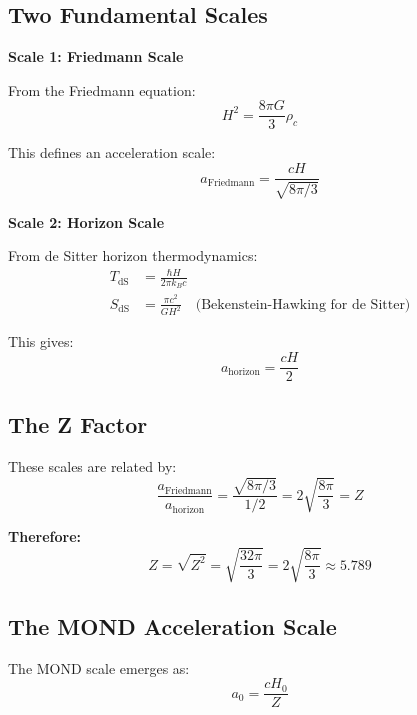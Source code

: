 \documentclass[12pt,a4paper]{article}
\begin{document}
\subsection{Two Fundamental Scales}

\textbf{Scale 1: Friedmann Scale}

From the Friedmann equation:
\begin{equation}
H^2 = \frac{8\pi G}{3} \rho_c
\end{equation}

This defines an acceleration scale:
\begin{equation}
a_{\text{Friedmann}} = \frac{cH}{\sqrt{8\pi/3}}
\end{equation}

\textbf{Scale 2: Horizon Scale}

From de Sitter horizon thermodynamics:
\begin{align}
T_{\text{dS}} &= \frac{\hbar H}{2\pi k_B c} \\
S_{\text{dS}} &= \frac{\pi c^2}{G H^2} \quad \text{(Bekenstein-Hawking for de Sitter)}
\end{align}

This gives:
\begin{equation}
a_{\text{horizon}} = \frac{cH}{2}
\end{equation}

\subsection{The Z Factor}

These scales are related by:
\begin{equation}
\frac{a_{\text{Friedmann}}}{a_{\text{horizon}}} = \frac{\sqrt{8\pi/3}}{1/2} = 2\sqrt{\frac{8\pi}{3}} = Z
\end{equation}

\textbf{Therefore:}
\begin{equation}
Z = \sqrt{Z^2} = \sqrt{\frac{32\pi}{3}} = 2\sqrt{\frac{8\pi}{3}} \approx 5.789
\end{equation}

\subsection{The MOND Acceleration Scale}

The MOND scale emerges as:
\begin{equation}
a_0 = \frac{cH_0}{Z}
\end{equation}
\end{document}
